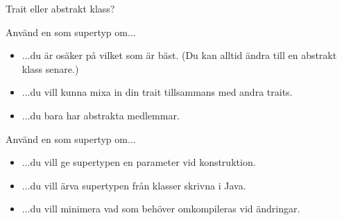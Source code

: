 \begin{Slide}{Trait eller abstrakt klass?}
\SlideFontSmall
\label{slideW07:traitorclass}
\begin{multicols}{2}
Använd en  som supertyp om...
\begin{itemize}
\item ...du är osäker på vilket som är bäst. (Du kan alltid ändra till en abstrakt klass senare.)
\item ...du vill kunna mixa in din trait tillsammans med andra traits.
\item ...du bara har abstrakta medlemmar.
\end{itemize}

\columnbreak

Använd en  som supertyp om...
\begin{itemize}
\item ...du vill ge supertypen en parameter vid konstruktion.
\item ...du vill ärva supertypen från klasser skrivna i Java.
\item ...du vill minimera vad som behöver omkompileras vid ändringar.
\end{itemize}


\end{multicols}
\end{Slide}





